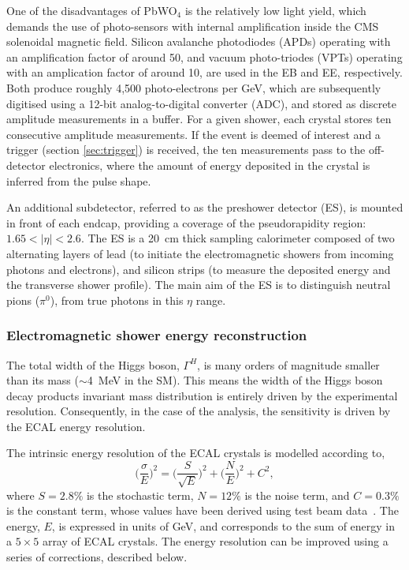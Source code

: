 One of the disadvantages of PbWO$_4$ is the relatively low light yield, which demands the use of photo-sensors with internal amplification inside the CMS solenoidal magnetic field. Silicon avalanche photodiodes (APDs) operating with an amplification factor of around 50, and vacuum photo-triodes (VPTs) operating with an amplication factor of around 10, are used in the EB and EE, respectively. Both produce roughly 4,500 photo-electrons per GeV, which are subsequently digitised using a 12-bit analog-to-digital converter (ADC), and stored as discrete amplitude measurements in a buffer. For a given shower, each crystal stores ten consecutive amplitude measurements. If the event is deemed of interest and a trigger (section \ref{sec:trigger}) is received, the ten measurements pass to the off-detector electronics, where the amount of energy deposited in the crystal is inferred from the pulse shape.

An additional subdetector, referred to as the preshower detector (ES), is mounted in front of each endcap, providing a coverage of the pseudorapidity region: $1.65<|\eta|<2.6$. The ES is a 20~cm thick sampling calorimeter composed of two alternating layers of lead (to initiate the electromagnetic showers from incoming photons and electrons), and silicon strips (to measure the deposited energy and the transverse shower profile). The main aim of the ES is to distinguish neutral pions ($\pi^0$), from true photons in this $\eta$ range. 

\subsubsection{Electromagnetic shower energy reconstruction}
The total width of the Higgs boson, $\Gamma^H$, is many orders of magnitude smaller than its mass ($\sim$4~MeV in the SM). This means the width of the Higgs boson decay products invariant mass distribution is entirely driven by the experimental resolution. Consequently, in the case of the \Hgg analysis, the sensitivity is driven by the ECAL energy resolution.

The intrinsic energy resolution of the ECAL crystals is modelled according to,
\begin{equation}
    \Big(\frac{\sigma}{E}\Big)^2 =  \Big(\frac{S}{\sqrt{E}}\Big)^2 + \Big(\frac{N}{E}\Big)^2 + C^2,
\end{equation}
\noindent
where $S=2.8\%$ is the stochastic term, $N=12\%$ is the noise term, and $C=0.3\%$ is the constant term, whose values have been derived using test beam data~\cite{Chatrchyan:2008zzk}. The energy, $E$, is expressed in units of GeV, and corresponds to the sum of energy in a $5\times5$ array of ECAL crystals. The energy resolution can be improved using a series of corrections, described below.

